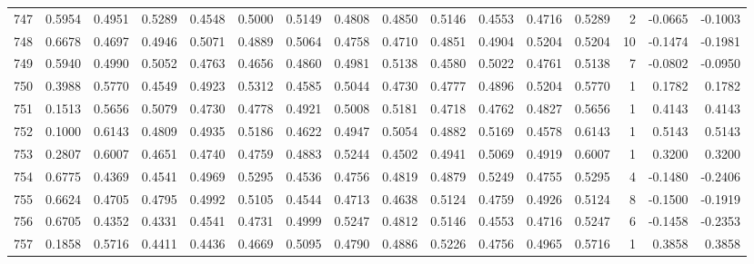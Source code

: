 \begin{tabular}{lrrrrrrrrrrrrrrr}
747 &      0.5954 &  0.4951 &  0.5289 &  0.4548 &  0.5000 &  0.5149 &  0.4808 &  0.4850 &  0.5146 &  0.4553 &   0.4716 &     0.5289 &      2 &                   -0.0665 &                    -0.1003 \\
748 &      0.6678 &  0.4697 &  0.4946 &  0.5071 &  0.4889 &  0.5064 &  0.4758 &  0.4710 &  0.4851 &  0.4904 &   0.5204 &     0.5204 &     10 &                   -0.1474 &                    -0.1981 \\
749 &      0.5940 &  0.4990 &  0.5052 &  0.4763 &  0.4656 &  0.4860 &  0.4981 &  0.5138 &  0.4580 &  0.5022 &   0.4761 &     0.5138 &      7 &                   -0.0802 &                    -0.0950 \\
750 &      0.3988 &  0.5770 &  0.4549 &  0.4923 &  0.5312 &  0.4585 &  0.5044 &  0.4730 &  0.4777 &  0.4896 &   0.5204 &     0.5770 &      1 &                    0.1782 &                     0.1782 \\
751 &      0.1513 &  0.5656 &  0.5079 &  0.4730 &  0.4778 &  0.4921 &  0.5008 &  0.5181 &  0.4718 &  0.4762 &   0.4827 &     0.5656 &      1 &                    0.4143 &                     0.4143 \\
752 &      0.1000 &  0.6143 &  0.4809 &  0.4935 &  0.5186 &  0.4622 &  0.4947 &  0.5054 &  0.4882 &  0.5169 &   0.4578 &     0.6143 &      1 &                    0.5143 &                     0.5143 \\
753 &      0.2807 &  0.6007 &  0.4651 &  0.4740 &  0.4759 &  0.4883 &  0.5244 &  0.4502 &  0.4941 &  0.5069 &   0.4919 &     0.6007 &      1 &                    0.3200 &                     0.3200 \\
754 &      0.6775 &  0.4369 &  0.4541 &  0.4969 &  0.5295 &  0.4536 &  0.4756 &  0.4819 &  0.4879 &  0.5249 &   0.4755 &     0.5295 &      4 &                   -0.1480 &                    -0.2406 \\
755 &      0.6624 &  0.4705 &  0.4795 &  0.4992 &  0.5105 &  0.4544 &  0.4713 &  0.4638 &  0.5124 &  0.4759 &   0.4926 &     0.5124 &      8 &                   -0.1500 &                    -0.1919 \\
756 &      0.6705 &  0.4352 &  0.4331 &  0.4541 &  0.4731 &  0.4999 &  0.5247 &  0.4812 &  0.5146 &  0.4553 &   0.4716 &     0.5247 &      6 &                   -0.1458 &                    -0.2353 \\
757 &      0.1858 &  0.5716 &  0.4411 &  0.4436 &  0.4669 &  0.5095 &  0.4790 &  0.4886 &  0.5226 &  0.4756 &   0.4965 &     0.5716 &      1 &                    0.3858 &                     0.3858 \\

\end{tabular}
